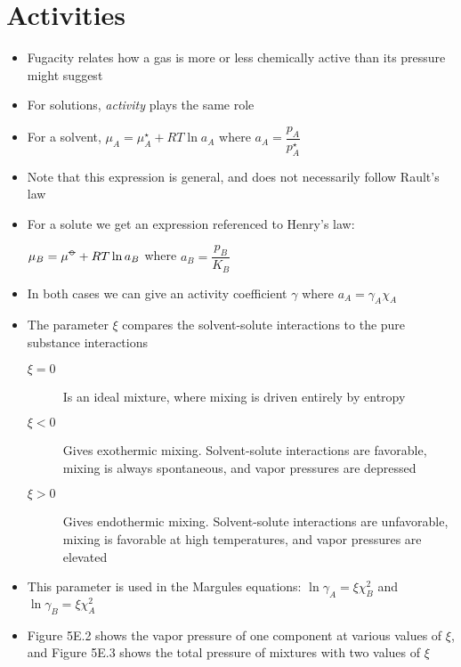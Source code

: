 \documentclass[12pt, openany, letterpaper]{memoir}
\begin{document}
\section{Activities}
\begin{itemize}
	\item Fugacity relates how a gas is more or less chemically active than its pressure might suggest
	\item For solutions, \emph{activity} plays the same role
	\item For a solvent, $\mu_A = \mu^\star_A + RT\ln a_A$ where $a_A=\dfrac{p_A}{p^\star_A}$
	\item Note that this expression is general, and does not necessarily follow Rault's law
	\item For a solute we get an expression referenced to Henry's law:

	      $\mu_B=\mu^{\std}+RT\ln a_B$ where $a_B=\dfrac{p_B}{K_B}$
	\item In both cases we can give an activity coefficient $\gamma$ where $a_A=\gamma_A\chi_A$
	\item The parameter $\xi$ compares the solvent-solute interactions to the pure substance interactions
	      \begin{description}
		      \item[$\xi=0$] Is an ideal mixture, where mixing is driven entirely by entropy
		      \item[$\xi<0$] Gives exothermic mixing. Solvent-solute interactions are favorable, mixing is always spontaneous, and vapor pressures are depressed
		      \item[$\xi>0$] Gives endothermic mixing. Solvent-solute interactions are unfavorable, mixing is favorable at high temperatures, and vapor pressures are elevated
	      \end{description}
	\item This parameter is used in the Margules equations: $\ln\gamma_A = \xi\chi_B^2$ and $\ln\gamma_B=\xi\chi_A^2$
	\item Figure 5E.2 shows the vapor pressure of one component at various values of $\xi$, and Figure 5E.3 shows the total pressure of mixtures with two values of $\xi$
\end{itemize}
\end{document}
